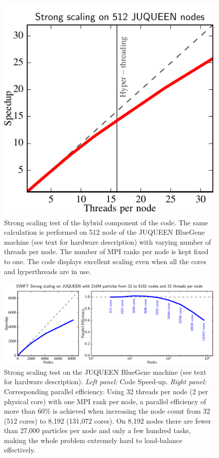 \documentclass{sig-alternate-05-2015}
\begin{document}
\begin{figure}
\centering
\includegraphics[width=\columnwidth]{Figures/scalingInNode}
\caption{Strong scaling test of the hybrid component of the code. The
  same calculation is performed on 512 node of the JUQUEEN BlueGene
  machine (see text for hardware description) with varying number of
  threads per node. The number of MPI ranks per node is kept fixed to
  one. The code displays excellent scaling even when all the cores and
  hyperthreads are in use. \label{fig:JUQUEEN1}}
\end{figure}  



\begin{figure}[t]
\centering
\includegraphics[width=\textwidth]{Figures/scalingBlueGene}
\caption{Strong scaling test on the JUQUEEN BlueGene machine (see text
  for hardware description). \textit{Left panel:} Code
  Speed-up. \textit{Right panel:} Corresponding parallel efficiency.
  Using 32 threads per node (2 per physical core) with one MPI rank
  per node, a parallel efficiency of more than $60\%$ is achieved when
  increasing the node count from 32 (512 cores) to 8,192 (131,072
  cores). On 8,192 nodes there are fewer than 27,000 particles per
  node and only a few hundred tasks, making the whole problem
  extremely hard to load-balance effectively.
  \label{fig:JUQUEEN2}}
\end{figure}
\end{document}
